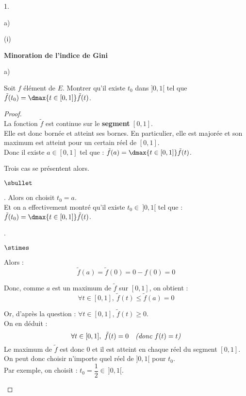 \begin{noliste}{1.}
\begin{noliste}{a)}
\begin{nonoliste}{(i)}
  \end{nonoliste}
 \end{noliste}
 
 \item \textbf{Minoration de l'indice de Gini} 
 \begin{noliste}{a)}
  \item Soit $f$ élément de $E$. Montrer qu'il existe $t_0$ dans 
  $]0,1[$ tel que $\tilde{f}(t_0)= \dmax{t \in [0,1]} \tilde{f}(t)$. 
  
  \begin{proof}~\\
    La fonction $\tilde{f}$ est continue sur le {\bf segment} 
      $[0,1]$.\\
      Elle est donc bornée et atteint ses bornes. En particulier, elle
      est majorée et son maximum est atteint pour un certain réel 
      de $[0,1]$.\\
      Donc il existe $a \in [0,1]$ tel que : $\tilde{f}(a) = 
      \dmax{t\in [0,1]} \tilde{f}(t)$.
      
      
      \newpage
      
      
      Trois cas se présentent alors.
      \begin{noliste}{$\sbullet$}
      \item \dashuline{Si $a \in \ ]0,1[$}. Alors on choisit $t_0=a$.\\
      Et on a effectivement montré qu'il existe $t_0 \in \ ]0,1[$ tel 
      que : $\tilde{f}(t_0) = \dmax{t\in [0,1]}\tilde{f}(t)$.
      
      \item {}. 
      \begin{noliste}{$\stimes$}
      \item Alors :
      \[
        \tilde{f}(a) = \tilde{f}(0) = 0 - f(0)=0
      \]
      
      \item Donc, comme $a$ est un maximum de $\tilde{f}$ sur $[0,1]$,
      on obtient :
      \[
        \forall t\in [0,1], \ \tilde{f}(t) \leq \tilde{f}(a)=0
      \]
      
      \item Or, d'après la question  : $\forall t\in [0,1]$, 
      $\tilde{f}(t) \geq 0$.\\
      On en déduit : 
      \[
        \forall t \in [0,1], \ \tilde{f}(t) =0 \quad \text{\it (donc 
        $f(t)=t$)}
      \]
      Le maximum de $\tilde{f}$ est donc $0$ et il est atteint en 
      chaque réel du segment $[0,1]$.\\
      On peut donc choisir n'importe quel réel de $]0,1[$ pour $t_0$.\\ 
      Par exemple, on choisit : $t_0=\dfrac{1}{2} \in \ ]0,1[$.
      \end{noliste}
      

\end{noliste}
\end{proof}
\end{noliste}
\end{noliste}
